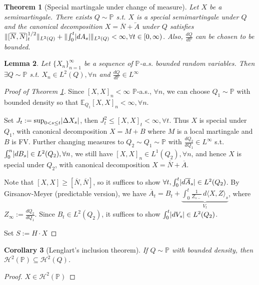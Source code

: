\documentclass[openany,oneside]{book}
\newtheorem{thm}{Theorem}[section]
\newtheorem{lem}[thm]{Lemma}
\newtheorem{cor}[thm]{Corollary}
\theoremstyle{definition}
\theoremstyle{remark}
\newcommand{\E}{\mathbb{E}} %
\renewcommand{\P}{\mathbb{P}} %
\DeclarePairedDelimiter{\abs}{\lvert}{\rvert} %
\DeclarePairedDelimiter{\norm}{\lVert}{\rVert} %
\newcommand{\sH}[1][2]{\mathcal{H}^{#1}} %
\begin{document}
\begin{thm}[Special martingale under change of measure] \label{special}
Let $X$ be a semimartingale. There exists $Q\sim \P$ s.t. $X$ is a special semimartingale under $Q$ and the canonical decomposition $X=\overline{N}+\overleftarrow{A}$ under $Q$ satisfies $\norm{[\overline{N},\overline{N}]_t^{1/2}}_{L^2(Q)} + \norm{\int_0^t\abs{d A_s}}_{L^2(Q)} < \infty, \forall t \in [0,\infty)$. Also, $\frac{d Q}{d\P}$ can be chosen to be bounded.
\end{thm}

\begin{lem}
Let $\{X_n\}_{n=1}^\infty$ be a sequence of $\P$-a.s. bounded random variables. Then $\exists Q\sim \P$ s.t. $X_n \in L^2(Q), \forall n$ and $\frac{d Q}{d\P} \in L^\infty$
\end{lem}

\begin{proof}[Proof of Theorem \ref{special}]
Since $[X,X]_n < \infty$ $\P$-a.s., $\forall n$, we can choose $Q_1 \sim \P$ with bounded density so that $\E_{Q_1}[X,X]_n < \infty, \forall n$.
\par
Set $J_t := \sup_{0< s\le t}\abs{\Delta X_s}$, then $J_t^2 \le [X,X]_t < \infty, \forall t$. Thus $X$ is special under $Q_1$, with canonical decomposition $X=M+B$ where $M$ is a local martingale and $B$ is FV. Further changing measures to $Q_2 \sim Q_1 \sim \P$ with $\frac{d Q_2}{d Q_1}\in L^\infty$ s.t. $\int_0^n \abs{d B_s} \in L^2(Q_2), \forall n$, we still have $[X,X]_n \in L^1(Q_2), \forall n$, and hence $X$ is special under $Q_2$, with canonical decomposition $X=\overline{N}+\overline{A}$.
\par
Note that $[X,X] \ge [\overline{N},\overline{N}]$, so it suffices to show $\forall t, \int_0^t \abs{d\overline{A}_s} \in L^2(Q_2)$. By Girsanov-Meyer (predictable version), we have $\overline{A}_t = B_t + \underbrace{\int_0^t \frac{1}{Z_{s-}} \,d\langle X,Z\rangle_s}_{V_t}$, where $Z_\infty := \frac{d Q_2}{d Q_1}$. Since $B_t\in L^2(Q_2)$, it suffices to show $\int_0^t \abs{d V_s} \in L^2(Q_2)$.
\par
Set $S:=H\cdot X$
\end{proof}

\begin{cor}[Lenglart's inclusion theorem]
If $Q\sim\P$ with bounded density, then $\sH(\P) \subseteq \sH(Q)$.
\end{cor}
\begin{proof}
$X\in \sH(\P)$
\end{proof}
\end{document}
